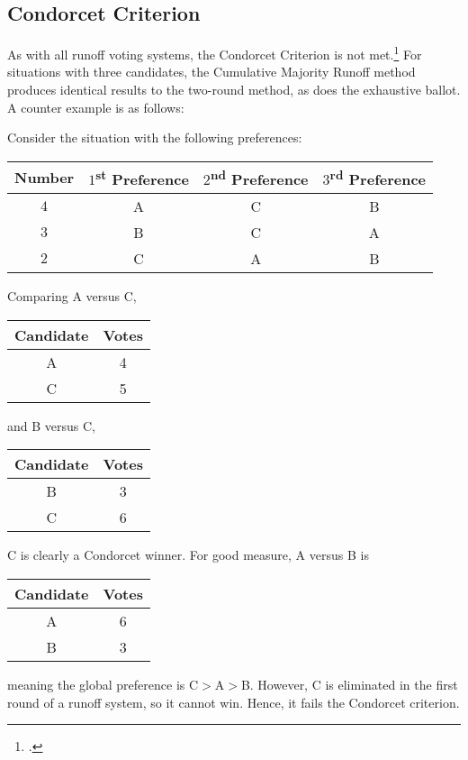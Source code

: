 \documentclass{article}
\newcommand{\super}{\textsuperscript}
\begin{document}
\subsection{Condorcet Criterion}
As with all runoff voting systems, the Condorcet Criterion is not met.\footcite[86]{Woodall_1997} For situations with three candidates, the Cumulative Majority Runoff method produces identical results to the two-round method, as does the exhaustive ballot. A counter example is as follows:

Consider the situation with the following preferences:
\begin{table}[H]\centering
\begin{tabular}{|c|c|c|c|}
\hline\rowcolor{headc}
Number & $1$\super{st} Preference & $2$\super{nd} Preference & $3$\super{rd} Preference\\
\hline
$4$ & A & C & B \\ \hline
$3$ & B & C & A \\ \hline
$2$ & C & A & B \\ \hline
\end{tabular}
\end{table}
Comparing A versus C,
\begin{table}[H]\centering
\begin{tabular}{|c|c|}
\hline\rowcolor{headc}
Candidate & Votes \\
\hline
A & 4 \\ \hline \rowcolor{advc}
C & 5 \\ \hline
\end{tabular}
\end{table}
and B versus C,
\begin{table}[H]\centering
\begin{tabular}{|c|c|}
\hline\rowcolor{headc}
Candidate & Votes \\
\hline
B & 3 \\ \hline \rowcolor{advc}
C & 6 \\ \hline
\end{tabular}
\end{table}
C is clearly a Condorcet winner. For good measure, A versus B is
\begin{table}[H]\centering
\begin{tabular}{|c|c|}
\hline\rowcolor{headc}
Candidate & Votes \\
\hline\rowcolor{advc}
A & 6 \\ \hline 
B & 3 \\ \hline
\end{tabular}
\end{table}
meaning the global preference is C$>$A$>$B. However, C is eliminated in the first round of a runoff system, so it cannot win. Hence, it fails the Condorcet criterion.
\end{document}
